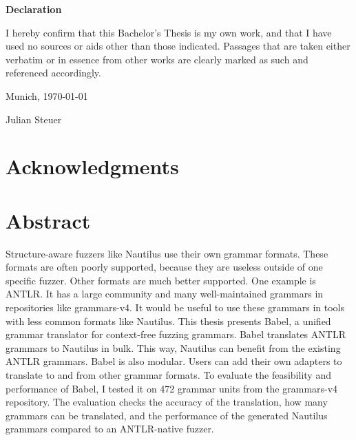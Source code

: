 \documentclass[thesis]{plai}
\begin{document}
\cleardoublepage

\vspace*{0.55\textheight}
\noindent
\begin{center}
    {\large\textbf{Declaration}}
\end{center}

\begin{flushleft}
    I hereby confirm that this Bachelor's Thesis is my own work, and that I have used no sources or aids other than those indicated. Passages that are taken either verbatim or in essence from other works are clearly marked as such and referenced accordingly.

    \makeatother

    \vspace{15mm}
    \noindent

    Munich, \today{}

    Julian Steuer
\end{flushleft}

\cleardoublepage

\chapter*{Acknowledgments}
\chapter*{Abstract}
Structure-aware fuzzers like Nautilus use their own grammar formats. These formats are often poorly supported, because they are useless outside of one specific fuzzer. Other formats are much better supported. One example is ANTLR. It has a large community and many well-maintained grammars in repositories like grammars-v4. It would be useful to use these grammars in tools with less common formats like Nautilus. This thesis presents Babel, a unified grammar translator for context-free fuzzing grammars. Babel translates ANTLR grammars to Nautilus in bulk. This way, Nautilus can benefit from the existing ANTLR grammars. Babel is also modular. Users can add their own adapters to translate to and from other grammar formats.
To evaluate the feasibility and performance of Babel, I tested it on 472 grammar units from the grammars-v4 repository. The evaluation checks the accuracy of the translation, how many grammars can be translated, and the performance of the generated Nautilus grammars compared to an ANTLR-native fuzzer.
\tableofcontents

\cleardoublepage
{}
\setcounter{page}{1}
\end{document}
